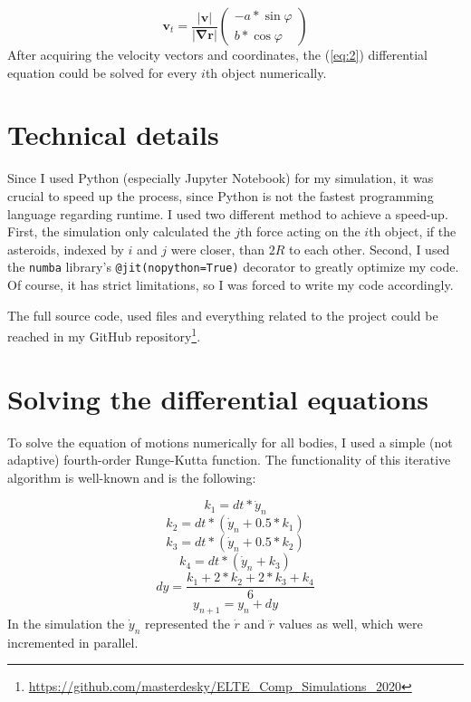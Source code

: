 \begin{multicols}{2}
\begin{equation} \label{eq:10}
\boldsymbol{v}_{t}
=
\frac{\left| \boldsymbol{v} \right|}{\left| \boldsymbol{\nabla} \boldsymbol{r} \right|}
\begin{pmatrix}
-a * \sin{\varphi} \\
b * \cos{\varphi}
\end{pmatrix}
\end{equation}
After acquiring the velocity vectors and coordinates, the (\ref{eq:2}) differential equation could be solved for every $i$th object numerically.

\section{Technical details}
Since I used Python (especially Jupyter Notebook) for my simulation, it was crucial to speed up the process, since Python is not the fastest programming language regarding runtime. I used two different method to achieve a speed-up. First, the simulation only calculated the $j$th force acting on the $i$th object, if the asteroids, indexed by $i$ and $j$ were closer, than $2R$ to each other. Second, I used the \texttt{numba} library's \texttt{@jit(nopython=True)} decorator to greatly optimize my code. Of course, it has strict limitations, so I was forced to write my code accordingly. \par
The full source code, used files and everything related to the project could be reached in my GitHub repository\footnote{\url{https://github.com/masterdesky/ELTE\_Comp\_Simulations\_2020}}.

\section{Solving the differential equations}
To solve the equation of motions numerically for all bodies, I used a simple (not adaptive) fourth-order Runge-Kutta function. The functionality of this iterative algorithm is well-known and is the following:

\begin{equation}
k_{1} = dt * \dot{y}_{n}
\end{equation}
\begin{equation}
k_{2} = dt * \left( \dot{y}_{n} + 0.5 * k_1 \right)
\end{equation}
\begin{equation}
k_{3} = dt * \left( \dot{y}_{n} + 0.5 * k_2 \right)
\end{equation}
\begin{equation}
k_{4} = dt * \left( \dot{y}_{n} + k_3 \right)
\end{equation}
\begin{equation}
dy = \frac{k_{1} + 2 * k_{2} + 2 * k_{3} + k_{4}}{6}
\end{equation}
\begin{equation}
y_{n+1} = y_{n} + dy
\end{equation}
In the simulation the $\dot{y}_{n}$ represented the $\dot{r}$ and $\ddot{r}$ values as well, which were incremented in parallel.


\end{multicols}
